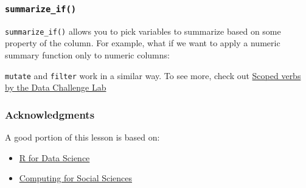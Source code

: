 \documentclass[]{book}
\newenvironment{Shaded}{\begin{snugshade}}{\end{snugshade}}
\newcommand{\CommentTok}[1]{\textcolor[rgb]{0.56,0.35,0.01}{\textit{#1}}}
\newcommand{\DataTypeTok}[1]{\textcolor[rgb]{0.13,0.29,0.53}{#1}}
\newcommand{\KeywordTok}[1]{\textcolor[rgb]{0.13,0.29,0.53}{\textbf{#1}}}
\newcommand{\NormalTok}[1]{#1}
\newcommand{\OperatorTok}[1]{\textcolor[rgb]{0.81,0.36,0.00}{\textbf{#1}}}
\newcommand{\StringTok}[1]{\textcolor[rgb]{0.31,0.60,0.02}{#1}}
\providecommand{\tightlist}{%
  \setlength{\itemsep}{0pt}\setlength{\parskip}{0pt}}
\begin{document}
\begin{Shaded}
\end{Shaded}

\hypertarget{summarize_if}{%
\subsubsection*{\texorpdfstring{\texttt{summarize\_if()}}{summarize\_if()}}\label{summarize_if}}

\texttt{summarize\_if()} allows you to pick variables to summarize based on some property of the column. For example, what if we want to apply a numeric summary function only to numeric columns:

\begin{Shaded}
\end{Shaded}

\texttt{mutate} and \texttt{filter} work in a similar way. To see more, check out \href{https://dcl-2017-04.github.io/curriculum/manip-scoped.html}{Scoped verbs by the Data Challenge Lab}

\hypertarget{acknowledgments-6}{%
\subsubsection*{Acknowledgments}\label{acknowledgments-6}}

A good portion of this lesson is based on:

\begin{itemize}
\tightlist
\item
  \href{https://r4ds.had.co.nz/iteration.html}{R for Data Science}
\item
  \href{https://cfss.uchicago.edu/notes/iteration/}{Computing for Social Sciences}
\end{itemize}
\end{document}

